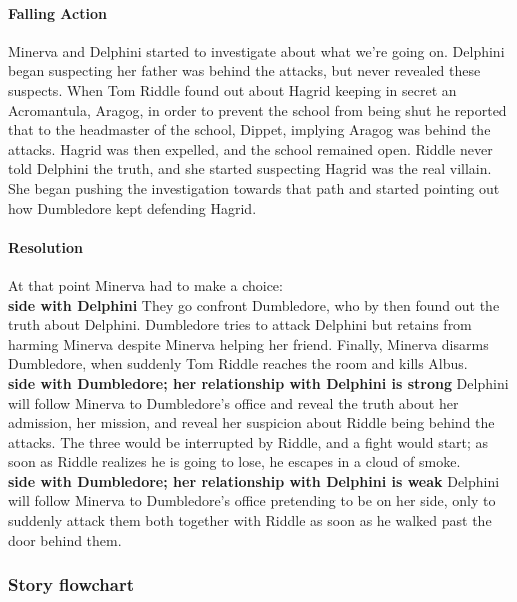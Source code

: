 \paragraph{Falling Action}
Minerva and Delphini started to investigate about what we're going on. Delphini began suspecting her father was behind the attacks, but never revealed these suspects.
When Tom Riddle found out about Hagrid keeping in secret an Acromantula, Aragog, in order to prevent the school from being shut he reported that to the headmaster of the school, Dippet, implying Aragog was behind the attacks. Hagrid was then expelled,  and the school remained open.
Riddle never told Delphini the truth, and she started suspecting Hagrid was the real villain. She began pushing the investigation towards that path  and started pointing out how Dumbledore kept defending Hagrid.

\paragraph{Resolution}
At that point Minerva had to make a choice: \\

\textbf{side with Delphini}
They go confront Dumbledore, who by then found out the truth about Delphini. Dumbledore tries to attack Delphini but retains from harming Minerva despite Minerva helping her friend. Finally, Minerva disarms Dumbledore, when suddenly Tom Riddle reaches the room and kills Albus.\\

\textbf{side with Dumbledore; her relationship with Delphini is strong}
Delphini will follow Minerva to Dumbledore's office and reveal the truth about her admission, her mission, and reveal her suspicion about Riddle being behind the attacks. The three would be interrupted by Riddle, and a fight would start; as soon as Riddle realizes he is going to lose, he escapes in a cloud of smoke.\\

\textbf{side with Dumbledore; her relationship with Delphini is weak}
Delphini will follow Minerva to Dumbledore's office pretending to be on her side, only to suddenly attack them both together with Riddle as soon as he walked past the door behind them.

\subsubsection{Story flowchart}


\pagebreak